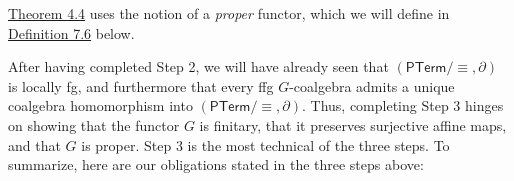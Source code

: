\documentclass[11pt,a4paper]{amsart}
\begin{document}
\hypertarget{html:S4.SS0.SSSx3.p2}{} \hyperlink{html:S4.Thmtheorem4}{Theorem 4.4} uses the notion of a \emph{proper} functor, which we will define in \hyperlink{html:S7.Thmtheorem6}{Definition 7.6} below.
\par\medskip
\hypertarget{html:S4.SS0.SSSx3.p3}{} After having completed Step 2, we will have already seen that %
\hypertarget{html:S4.SS0.SSSx3.p3.m1}{}\({(\mathsf{PTerm}/{\equiv},\partial)}\) is locally fg, and furthermore that every ffg %
\hypertarget{html:S4.SS0.SSSx3.p3.m2}{}\({G}\)-coalgebra admits a unique coalgebra homomorphism into %
\hypertarget{html:S4.SS0.SSSx3.p3.m3}{}\({(\mathsf{PTerm}/{\equiv},\partial)}\). Thus, completing Step 3 hinges on showing that the functor %
\hypertarget{html:S4.SS0.SSSx3.p3.m4}{}\({G}\) is finitary, that it preserves surjective affine maps, and that %
\hypertarget{html:S4.SS0.SSSx3.p3.m5}{}\({G}\) is proper. Step 3 is the most technical of the three steps. \newline{}To summarize, here are our obligations stated in the three steps above:
\par\medskip
\hypertarget{html:S4.I1}{}
\end{document}
